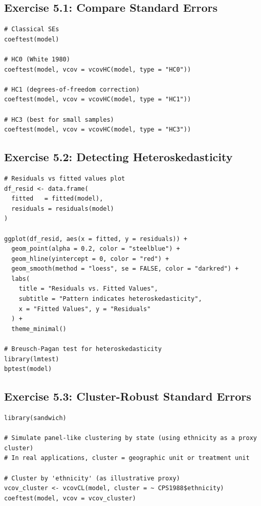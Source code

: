 \subsection{Exercise 5.1: Compare Standard Errors}

\begin{lstlisting}
# Classical SEs
coeftest(model)

# HC0 (White 1980)
coeftest(model, vcov = vcovHC(model, type = "HC0"))

# HC1 (degrees-of-freedom correction)
coeftest(model, vcov = vcovHC(model, type = "HC1"))

# HC3 (best for small samples)
coeftest(model, vcov = vcovHC(model, type = "HC3"))
\end{lstlisting}

\subsection{Exercise 5.2: Detecting Heteroskedasticity}

\begin{lstlisting}
# Residuals vs fitted values plot
df_resid <- data.frame(
  fitted   = fitted(model),
  residuals = residuals(model)
)

ggplot(df_resid, aes(x = fitted, y = residuals)) +
  geom_point(alpha = 0.2, color = "steelblue") +
  geom_hline(yintercept = 0, color = "red") +
  geom_smooth(method = "loess", se = FALSE, color = "darkred") +
  labs(
    title = "Residuals vs. Fitted Values",
    subtitle = "Pattern indicates heteroskedasticity",
    x = "Fitted Values", y = "Residuals"
  ) +
  theme_minimal()

# Breusch-Pagan test for heteroskedasticity
library(lmtest)
bptest(model)
\end{lstlisting}

\subsection{Exercise 5.3: Cluster-Robust Standard Errors}

\begin{lstlisting}
library(sandwich)

# Simulate panel-like clustering by state (using ethnicity as a proxy cluster)
# In real applications, cluster = geographic unit or treatment unit

# Cluster by 'ethnicity' (as illustrative proxy)
vcov_cluster <- vcovCL(model, cluster = ~ CPS1988$ethnicity)
coeftest(model, vcov = vcov_cluster)
\end{lstlisting}

